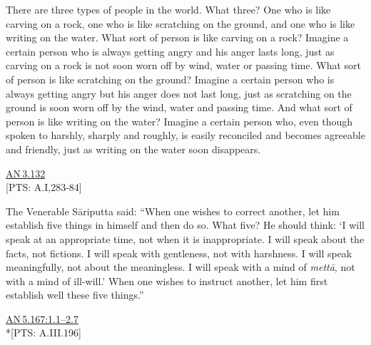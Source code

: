 \documentclass[10pt, openright]{book}
\begin{document}
\begin{flushright}
[PTS: *Ja.I,24]


\end{flushright}
There are three types of people in the world. What three? One who is like carving on a rock, one who is like scratching on the ground, and one who is like writing on the water. What sort of person is like carving on a rock? Imagine a certain person who is always getting angry and his anger lasts long, just as carving on a rock is not soon worn off by wind, water or passing time. What sort of person is like scratching on the ground? Imagine a certain person who is always getting angry but his anger does not last long, just as scratching on the ground is soon worn off by the wind, water and passing time. And what sort of person is like writing on the water? Imagine a certain person who, even though spoken to harshly, sharply and roughly, is easily reconciled and becomes agreeable and friendly, just as writing on the water soon disappears.


\begin{flushright}
\href{https://suttacentral.net/an3.132/en/sujato}{AN 3.132}\\

[PTS: A.I,283-84]


\end{flushright}
The Venerable Sāriputta said: “When one wishes to correct another, let him establish five things in himself and then do so. What five? He should think: ‘I will speak at an appropriate time, not when it is inappropriate. I will speak about the facts, not fictions. I will speak with gentleness, not with harshness. I will speak meaningfully, not about the meaningless. I will speak with a mind of \textit{mettā}, not with a mind of ill-will.’ When one wishes to instruct another, let him first establish well these five things.”


\begin{flushright}
\href{https://suttacentral.net/an5.167/en/sujato\#1.1}{AN 5.167:1.1–2.7}\\

*[PTS: A.III.196]


\end{flushright}
\end{document}
